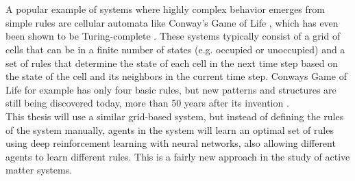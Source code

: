 \\
\\
A popular example of systems where highly complex behavior emerges from simple rules are cellular automata like Conway's Game of Life \cite{bays_introduction_2010,gotts_emergent_2010}, which has even been shown to be Turing-complete \cite{rendell_turing_2002}. These systems typically consist of a grid of cells that can be in a finite number of states (e.g. occupied or unoccupied) and a set of rules that determine the state of each cell in the next time step based on the state of the cell and its neighbors in the current time step. Conways Game of Life for example has only four basic rules, but new patterns and structures are still being discovered today, more than 50 years after its invention \cite{noauthor_elementary_nodate}.
\\
This thesis will use a similar grid-based system, but instead of defining the rules of the system manually, agents in the system will learn an optimal set of rules using deep reinforcement learning with neural networks, also allowing different agents to learn different rules. This is a fairly new approach in the study of active matter systems.


